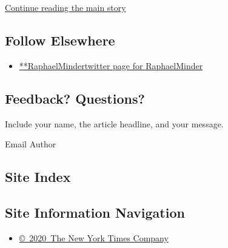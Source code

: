 \protect\hyperlink{after-mid2}{Continue reading the main story}

\hypertarget{follow-elsewhere}{%
\subsection{Follow Elsewhere}\label{follow-elsewhere}}

\begin{itemize}
\tightlist
\item
  \href{https://twitter.com/RaphaelMinder}{**RaphaelMindertwitter page
  for RaphaelMinder}
\end{itemize}

\hypertarget{feedback-questions}{%
\subsection{Feedback? Questions?}\label{feedback-questions}}

Include your name, the article headline, and your message.

Email Author

\hypertarget{site-index}{%
\subsection{Site Index}\label{site-index}}

\hypertarget{site-information-navigation}{%
\subsection{Site Information
Navigation}\label{site-information-navigation}}

\begin{itemize}
\tightlist
\item
  \href{https://help.nytimes.com/hc/en-us/articles/115014792127-Copyright-notice}{©~2020~The
  New York Times Company}
\end{itemize}

